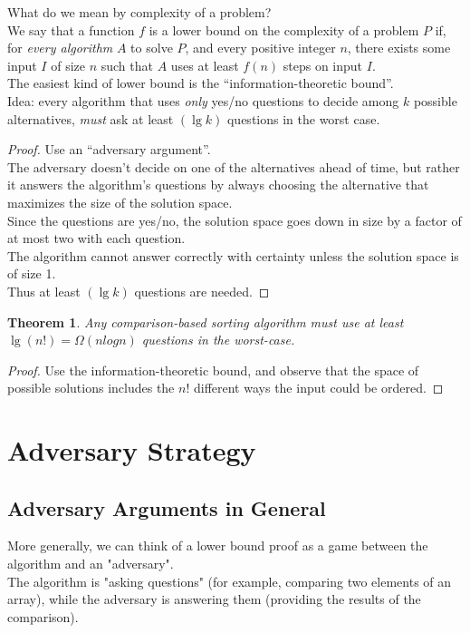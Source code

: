 \documentclass[12pt]{article}
\theoremstyle{plain}
\newtheorem{theorem}{Theorem}[subsection]
\theoremstyle{definition}
\begin{document}
What do we mean by complexity of a problem? \\
We say that a function $f$ is a lower bound on the complexity of a problem $P$ if, for \emph{every algorithm} $A$ to solve $P$, and every positive integer $n$, there exists some input $I$ of size $n$ such that $A$ uses at least $f(n)$ steps on input $I$. \\

The easiest kind of lower bound is the ``information-theoretic bound''. \\
Idea: every algorithm that uses \emph{only} yes/no questions to decide among $k$ possible alternatives, \emph{must} ask at least $(\lg k)$ questions in the worst case.
\begin{proof}
Use an ``adversary argument''. \\
The adversary doesn't decide on one of the alternatives ahead of time, but rather it answers the algorithm's questions by always choosing the alternative that maximizes the size of the solution space. \\
Since the questions are yes/no, the solution space goes down in size by a factor of at most two with each question. \\
The algorithm cannot answer correctly with certainty unless the solution space is of size 1. \\
Thus at least $(\lg k)$ questions are needed.
\end{proof}

\begin{theorem}
Any comparison-based sorting algorithm must use at least $\lg(n!) = \Omega(n log n)$ questions in the worst-case.
\end{theorem}
\begin{proof}
Use the information-theoretic bound, and observe that the space of possible solutions includes the $n!$ different ways the input could be ordered.
\end{proof}

\newpage
\section{Adversary Strategy}
\subsection{Adversary Arguments in General}
More generally, we can think of a lower bound proof as a game between the algorithm and an "adversary". \\
The algorithm is "asking questions" (for example, comparing two elements of an array), while the adversary is answering them (providing the results of the comparison). \\
\end{document}
